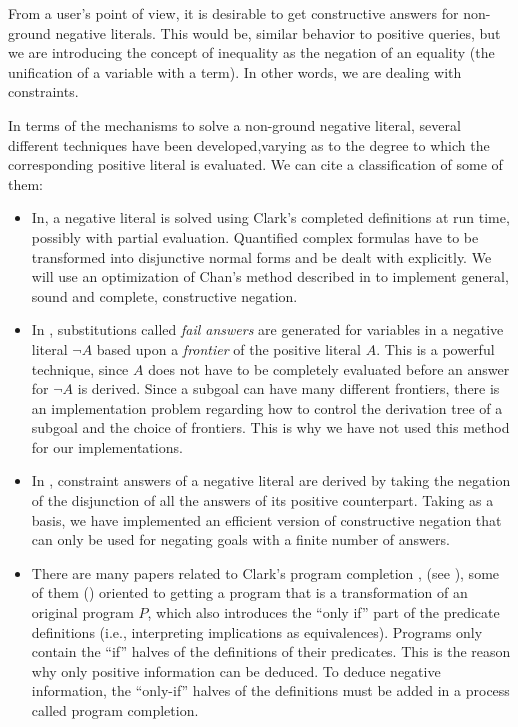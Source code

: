 \documentclass{tlp}
\begin{document}
From a user's point of view, it is desirable to get constructive
answers for non-ground negative literals. This would be, similar
behavior to positive queries, but we are introducing the concept of
inequality as the negation of an equality (the unification of a
variable with a term). In other words, we are dealing with
constraints.
 
In terms of the mechanisms to solve a non-ground negative literal,
several different techniques have been developed,varying as to the
degree to which the corresponding positive literal is evaluated. We
can cite a classification of some of them:
\begin{itemize}

\item In\cite{Chan2,Stuckey,Wallace}, a negative literal is solved
using Clark's completed definitions at run time, possibly with partial
evaluation. Quantified complex formulas have to be transformed into
disjunctive normal forms and be dealt with explicitly. We will use an
optimization of Chan's method described in \cite{Chan2} to implement
general, sound and complete, constructive negation.%

\item In \cite{Drabent,Fages,Malus}, substitutions called \emph{fail
answers} are generated for variables in a negative literal $\neg A$
based upon a \emph{frontier} of the positive literal $A$. This is a
powerful technique, since $A$ does not have to be completely evaluated
before an answer for $\neg A$ is derived. Since a subgoal can have
many different frontiers, there is an implementation problem regarding
how to control the derivation tree of a subgoal and the choice of
frontiers. This is why we have not used this method for our
implementations.

\item In \cite{Bossu,Chan1,Damasio,Khabaza,Przymusinski2},
constraint answers of a negative literal are derived by taking the
negation of the disjunction of all the answers of its positive
counterpart. Taking \cite{Chan1} as a basis, we have implemented an
efficient version of constructive negation that can only be used for
negating goals with a finite number of answers. %


\item There are many papers related to Clark's program completion
\cite{Clark}, (see \cite{Lloyd,Apt}), some of them
(\cite{Barbuti1,Barbuti2}) oriented to getting a program that is a
transformation of an original program $P$, which also introduces the
``only if'' part of the predicate definitions (i.e., interpreting
implications as equivalences). Programs only contain the ``if'' halves of
the definitions of their predicates. This is the reason why only
positive information can be deduced. To deduce negative
information, the ``only-if'' halves of the definitions must be added in
a process called program completion.

\end{itemize}
\end{document}
